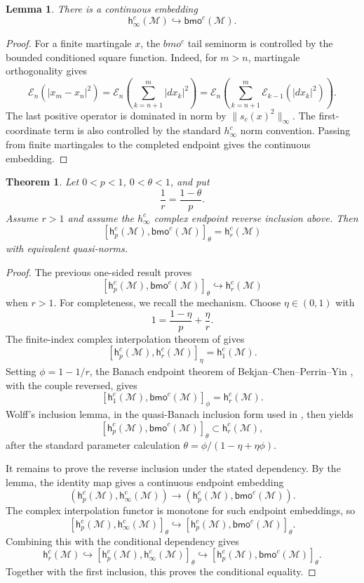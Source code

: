 \documentclass[11pt]{article}
\newcommand{\M}{\mathcal M}
\newcommand{\h}{\mathsf h}
\newcommand{\bmo}{\mathsf{bmo}}
\newtheorem{theorem}{Theorem}
\newtheorem{lemma}{Lemma}
\begin{document}
\begin{lemma}
There is a continuous embedding
\[
\h_\infty^c(\M)\hookrightarrow \bmo^c(\M).
\]
\end{lemma}

\begin{proof}
For a finite martingale \(x\), the \(bmo^c\) tail seminorm is controlled by
the bounded conditioned square function. Indeed, for \(m>n\), martingale
orthogonality gives
\[
\mathcal E_n\left(|x_m-x_n|^2\right)
  =\mathcal E_n\left(\sum_{k=n+1}^m |dx_k|^2\right)
  =\mathcal E_n\left(\sum_{k=n+1}^m
       \mathcal E_{k-1}(|dx_k|^2)\right).
\]
The last positive operator is dominated in norm by
\(\|s_c(x)^2\|_\infty\). The first-coordinate term is also controlled by the
standard \(h_\infty^c\) norm convention. Passing from finite martingales to
the completed endpoint gives the continuous embedding.
\end{proof}

\begin{theorem}
Let \(0<p<1\), \(0<\theta<1\), and put
\[
\frac1r=\frac{1-\theta}{p}.
\]
Assume \(r>1\) and assume the \(h_\infty^c\) complex endpoint reverse
inclusion above. Then
\[
[\h_p^c(\M),\bmo^c(\M)]_\theta=\h_r^c(\M)
\]
with equivalent quasi-norms.
\end{theorem}

\begin{proof}
The previous one-sided result proves
\[
[\h_p^c(\M),\bmo^c(\M)]_\theta\hookrightarrow \h_r^c(\M)
\]
when \(r>1\). For completeness, we recall the mechanism. Choose
\(\eta\in(0,1)\) with
\[
1=\frac{1-\eta}{p}+\frac{\eta}{r}.
\]
The finite-index complex interpolation theorem of \cite[Theorem 3.16]{Ran2021}
gives
\[
[\h_p^c(\M),\h_r^c(\M)]_\eta=\h_1^c(\M).
\]
Setting \(\phi=1-1/r\), the Banach endpoint theorem of
Bekjan--Chen--Perrin--Yin \cite[Theorem 4.4]{BCPY2009}, with the couple
reversed, gives
\[
[\h_1^c(\M),\bmo^c(\M)]_\phi=\h_r^c(\M).
\]
Wolff's inclusion lemma, in the quasi-Banach inclusion form used in
\cite[Corollary 3.19]{Ran2021}, then yields
\[
[\h_p^c(\M),\bmo^c(\M)]_\theta\subset \h_r^c(\M),
\]
after the standard parameter calculation
\(\theta=\phi/(1-\eta+\eta\phi)\).

It remains to prove the reverse inclusion under the stated dependency. By
the lemma, the identity map gives a continuous endpoint embedding
\[
(\h_p^c(\M),\h_\infty^c(\M))
\longrightarrow
(\h_p^c(\M),\bmo^c(\M)).
\]
The complex interpolation functor is monotone for such endpoint embeddings,
so
\[
[\h_p^c(\M),\h_\infty^c(\M)]_\theta
\hookrightarrow
[\h_p^c(\M),\bmo^c(\M)]_\theta .
\]
Combining this with the conditional dependency gives
\[
\h_r^c(\M)
\hookrightarrow [\h_p^c(\M),\h_\infty^c(\M)]_\theta
\hookrightarrow [\h_p^c(\M),\bmo^c(\M)]_\theta .
\]
Together with the first inclusion, this proves the conditional equality.
\end{proof}
\end{document}
